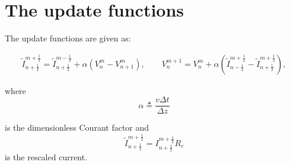 \section{The update functions}
The update functions are given as:

\begin{align}
    \tilde{I}^{m+\frac{1}{2}}_{n+\frac{1}{2}} = \tilde{I}^{m-\frac{1}{2}}_{n+\frac{1}{2}} + \alpha\left(V^{m}_{n} - V^{m}_{n+1}\right) \label{update}, \quad\quad
    V^{m+1}_n = V^{m}_{n} + \alpha\left(\tilde{I}^{m+\frac{1}{2}}_{n-\frac{1}{2}}-\tilde{I}^{m+\frac{1}{2}}_{n+\frac{1}{2}}\right),  
    \end{align}
    
where
\begin{equation}
\alpha \triangleq \frac{v\Delta t}{\Delta z}
    \label{alpha}
\end{equation}

is the dimensionless Courant factor and
\begin{equation}
    \tilde{I}^{m+\frac{1}{2}}_{n+\frac{1}{2}} = I^{m+\frac{1}{2}}_{n+\frac{1}{2}}R_c
    \label{Itil}
\end{equation}
is the rescaled current.

